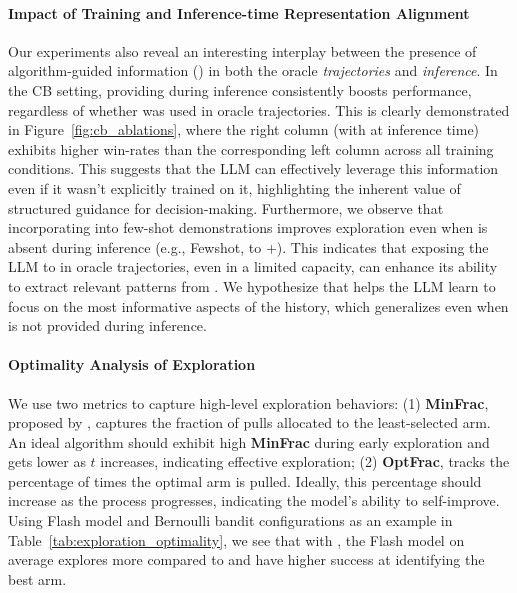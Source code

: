 \paragraph{Impact of Training and Inference-time Representation Alignment}
Our experiments also reveal an interesting interplay between the presence of algorithm-guided information (\AG) in both the oracle \emph{trajectories} and \emph{inference}. In the CB setting, providing \AG during inference consistently boosts performance, regardless of whether \AG was used in oracle trajectories. This is clearly demonstrated in Figure~\ref{fig:cb_ablations}, where the right column (with \AG at inference time) exhibits higher win-rates than the corresponding left column across all training conditions. This suggests that the LLM can effectively leverage this information even if it wasn't explicitly trained on it, highlighting the inherent value of structured guidance for decision-making.
Furthermore, we observe that incorporating \AG into few-shot demonstrations improves exploration even when \AG is absent during inference (e.g., Fewshot,  to \RH+). This indicates that exposing the LLM to \AG in oracle trajectories, even in a limited capacity, can enhance its ability to extract relevant patterns from \RH.  We hypothesize that \AG helps the LLM learn to focus on the most informative aspects of the history, which generalizes even when \AG is not provided during inference.

\paragraph{Optimality Analysis of Exploration}
We use two metrics to capture high-level exploration behaviors: (1) \textbf{MinFrac}, proposed by \citet{krishnamurthy2024can}, captures the fraction of pulls allocated to the least-selected arm. An ideal algorithm should exhibit high \textbf{MinFrac} during early exploration and gets lower as $t$ increases, indicating effective exploration; (2) \textbf{OptFrac}, tracks the percentage of times the optimal arm is pulled. Ideally, this percentage should increase as the process progresses, indicating the model's ability to self-improve. Using Flash model and Bernoulli bandit configurations as an example in Table~\ref{tab:exploration_optimality}, we see that with \AG, the Flash model on average explores more compared to \SH and have higher success at identifying the best arm.

